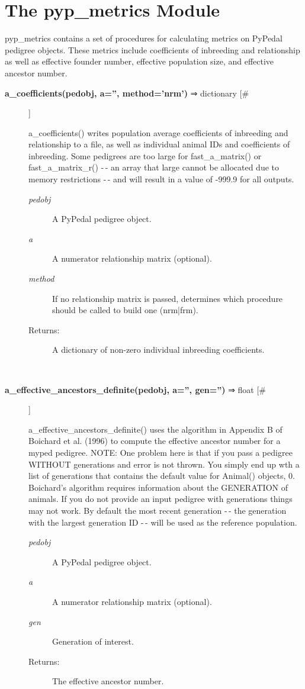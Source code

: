 \documentclass{article}
\begin{document}
\section*{The pyp\_metrics Module}
\par pyp\_metrics contains a set of procedures for calculating metrics on PyPedal
pedigree objects.  These metrics include coefficients of inbreeding and
relationship as well as effective founder number, effective population size,
and effective ancestor number.
\begin{description}
\item[\textbf{a\_coefficients(pedobj, a='', method='nrm')} ⇒ dictionary [\#]
]
\par a\_coefficients() writes population average coefficients of inbreeding and
relationship to a file, as well as individual animal IDs and coefficients of
inbreeding.  Some pedigrees are too large for fast\_a\_matrix() or fast\_a\_matrix\_r()
-$\,$- an array that large cannot be allocated due to memory restrictions -$\,$- and will
result in a value of -999.9 for all outputs.
\begin{description}
\item[\textit{pedobj}
]
A PyPedal pedigree object.
\item[\textit{a}
]
A numerator relationship matrix (optional).
\item[\textit{method}
]
If no relationship matrix is passed, determines which procedure should be called to build one (nrm|frm).
\item[Returns:
]
A dictionary of non-zero individual inbreeding coefficients.
\end{description}\\

\item[\textbf{a\_effective\_ancestors\_definite(pedobj, a='', gen='')} ⇒ float [\#]
]
\par a\_effective\_ancestors\_definite() uses the algorithm in Appendix B of Boichard et al.
(1996) to compute the effective ancestor number for a myped pedigree.
NOTE: One problem here is that if you pass a pedigree WITHOUT generations and error
is not thrown.  You simply end up wth a list of generations that contains the default
value for Animal() objects, 0.
Boichard's algorithm requires information about the GENERATION of animals.  If you
do not provide an input pedigree with generations things may not work.  By default
the most recent generation -$\,$- the generation with the largest generation ID -$\,$- will
be used as the reference population.
\begin{description}
\item[\textit{pedobj}
]
A PyPedal pedigree object.
\item[\textit{a}
]
A numerator relationship matrix (optional).
\item[\textit{gen}
]
Generation of interest.
\item[Returns:
]
The effective ancestor number.
\end{description}\\


\end{description}
\end{document}
